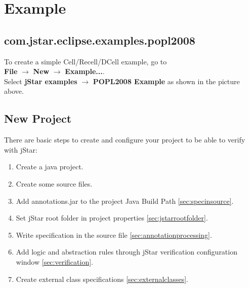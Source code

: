 \documentclass{article}
\begin{document}
\section{Example}

\subsection{com.jstar.eclipse.examples.popl2008}
To create a simple Cell/Recell/DCell example, go to\\ {\bf File} $\rightarrow$ {\bf New} $\rightarrow$ {\bf Example...}.\\


Select {\bf jStar examples}  $\rightarrow$ {\bf POPL2008 Example} as shown in the picture above. 

\subsection{New Project}

There are basic steps to create and configure your project to be able to verify with jStar:

\begin{enumerate}
\item Create a java project.
\item Create some source files.
\item Add annotations.jar to the project Java Build Path \ref{sec:specinsource}.
\item Set jStar root folder in project properties \ref{sec:jstarrootfolder}.
\item Write specification in the source file \ref{sec:annotationprocessing}.
\item Add logic and abstraction rules through jStar verification configuration window \ref{sec:verification}.
\item Create external class specifications \ref{sec:externalclasses}.
\end{enumerate}
\end{document}
